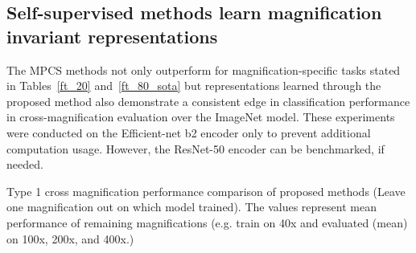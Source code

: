 \documentclass[conference]{IEEEtran}
\begin{document}
\subsection{Self-supervised methods learn magnification invariant representations}
The MPCS methods not only outperform for magnification-specific tasks stated in Tables~\ref{ft_20} and~\ref{ft_80_sota} but representations learned through the proposed method also demonstrate a consistent edge in classification performance in cross-magnification evaluation over the ImageNet model. These experiments were conducted on the Efficient-net b2 encoder only to prevent additional computation usage. However, the ResNet-50 encoder can be benchmarked, if needed.
\begin{table}[h]
\caption{Type 1 cross magnification performance  comparison of proposed methods (Leave one magnification out on which model trained). The values represent mean performance of remaining magnifications (e.g. train on 40x and evaluated (mean) on 100x, 200x, and 400x.)}
\label{tab:results_ft80_cross_magnificaiton}
\resizebox{\columnwidth}{!}{

}
\end{table}
\end{document}
